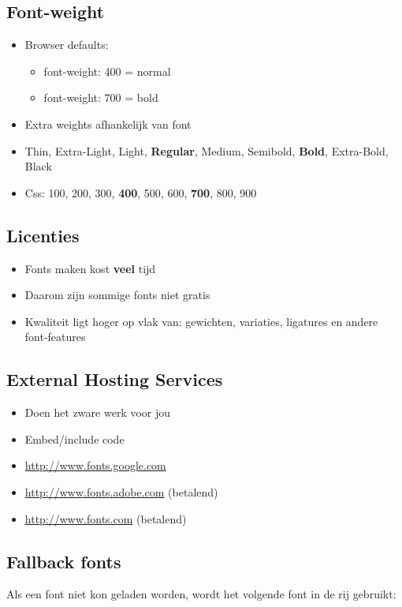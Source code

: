 \documentclass{article}
\newcommand{\bold}[1]{\textbf{#1}}
\begin{document}
\subsection{Font-weight}
\begin{itemize}
    \item Browser defaults:
    \begin{itemize}
        \item font-weight: 400 = normal
        \item font-weight: 700 = bold
    \end{itemize}
    \item Extra weights afhankelijk van font
    \item Thin, Extra-Light, Light, \bold{Regular}, Medium, Semibold, \bold{Bold}, Extra-Bold, Black
    \item Css: 100, 200, 300, \bold{400}, 500, 600, \bold{700}, 800, 900
\end{itemize}

\subsection{Licenties}
\begin{itemize}
    \item Fonts maken kost \bold{veel} tijd
    \item Daarom zijn sommige fonts niet gratis
    \item Kwaliteit ligt hoger op vlak van: gewichten, variaties, ligatures en andere font-features
\end{itemize}

\subsection{External Hosting Services}
\begin{itemize}
    \item Doen het zware werk voor jou
    \item Embed/include code
    \item \url{http://www.fonts.google.com}
    \item \url{http://www.fonts.adobe.com} (betalend)
    \item \url{http://www.fonts.com} (betalend)
\end{itemize}

\subsection{Fallback fonts}
Als een font niet kon geladen worden, wordt het volgende font in de rij gebruikt:
\end{document}
